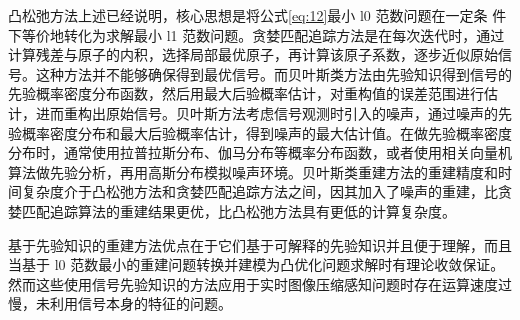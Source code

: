 \begin{table}[htbp]
\centering
\caption{传统基于先验知识的压缩感知重建方法及典型的实现算法}
\label{tab:reconstruction_methods}
\end{table}    

凸松弛方法上述已经说明，核心思想是将公式\ref{eq:12}最小 l0 范数问题在一定条
件下等价地转化为求解最小 l1 范数问题。贪婪匹配追踪方法是在每次迭代时，通过计算残差与原子的内积，选择局部最优原子，再计算该原子系数，逐步近似原始信号。这种方法并不能够确保得到最优信号。而贝叶斯类方法由先验知识得到信号的先验概率密度分布函数，然后用最大后验概率估计，对重构值的误差范围进行估计，进而重构出原始信号。贝叶斯方法考虑信号观测时引入的噪声，通过噪声的先验概率密度分布和最大后验概率估计，得到噪声的最大估计值。在做先验概率密度分布时，通常使用拉普拉斯分布、伽马分布等概率分布函数，或者使用相关向量机算法做先验分析，再用高斯分布模拟噪声环境。贝叶斯类重建方法的重建精度和时间复杂度介于凸松弛方法和贪婪匹配追踪方法之间，因其加入了噪声的重建，比贪婪匹配追踪算法的重建结果更优，比凸松弛方法具有更低的计算复杂度。

基于先验知识的重建方法优点在于它们基于可解释的先验知识并且便于理解，而且当基于 l0 范数最小的重建问题转换并建模为凸优化问题求解时有理论收敛保证。然而这些使用信号先验知识的方法应用于实时图像压缩感知问题时存在运算速度过慢，未利用信号本身的特征的问题。

